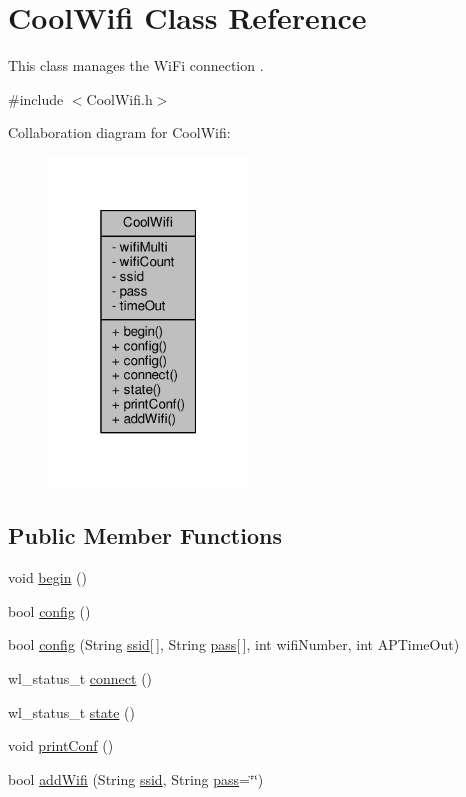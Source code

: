 \hypertarget{classCoolWifi}{}\section{Cool\+Wifi Class Reference}
\label{classCoolWifi}


This class manages the Wi\+Fi connection .  




{\ttfamily \#include $<$Cool\+Wifi.\+h$>$}



Collaboration diagram for Cool\+Wifi\+:\nopagebreak
\begin{figure}[H]
\begin{center}
\leavevmode
\includegraphics[width=151pt]{classCoolWifi__coll__graph}
\end{center}
\end{figure}
\subsection*{Public Member Functions}
\begin{DoxyCompactItemize}
\item 
void \hyperlink{classCoolWifi_a46942fed90e475112cc10b78a32e7aaa}{begin} ()
\item 
bool \hyperlink{classCoolWifi_a4eb2f6b9b09dd588964b88b6c70122c0}{config} ()
\item 
bool \hyperlink{classCoolWifi_a871d4a0d9978f17fdf6d874fc2958b6c}{config} (String \hyperlink{classCoolWifi_a893b21d0fed821438733bba2e73fb4c2}{ssid}\mbox{[}$\,$\mbox{]}, String \hyperlink{classCoolWifi_a0c3332a149245aaad060b32593a54c9b}{pass}\mbox{[}$\,$\mbox{]}, int wifi\+Number, int A\+P\+Time\+Out)
\item 
wl\+\_\+status\+\_\+t \hyperlink{classCoolWifi_ad060353050f40d032a2dbf9e54a768bf}{connect} ()
\item 
wl\+\_\+status\+\_\+t \hyperlink{classCoolWifi_a1c7b4d82a4098d346e7593dce92039fa}{state} ()
\item 
void \hyperlink{classCoolWifi_a9e6105c6d13d35ec510f6633da9e0223}{print\+Conf} ()
\item 
bool \hyperlink{classCoolWifi_a914d7a1df14dd6b75345fb614c34e9d6}{add\+Wifi} (String \hyperlink{classCoolWifi_a893b21d0fed821438733bba2e73fb4c2}{ssid}, String \hyperlink{classCoolWifi_a0c3332a149245aaad060b32593a54c9b}{pass}=\char`\"{}\char`\"{})
\end{DoxyCompactItemize}
